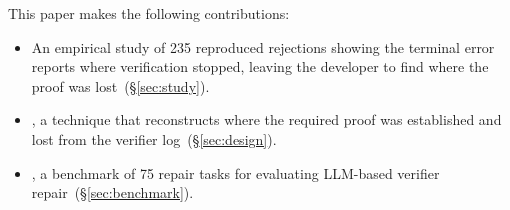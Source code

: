 This paper makes the following contributions:
\begin{itemize}
\item An empirical study of 235 reproduced rejections showing the terminal error reports where verification stopped, leaving the developer to find where the proof was lost~(\S\ref{sec:study}).
\item \sys, a technique that reconstructs where the required proof was established and lost from the verifier log~(\S\ref{sec:design}).
\item \bench, a benchmark of 75 repair tasks for evaluating LLM-based verifier repair~(\S\ref{sec:benchmark}).
\end{itemize}

